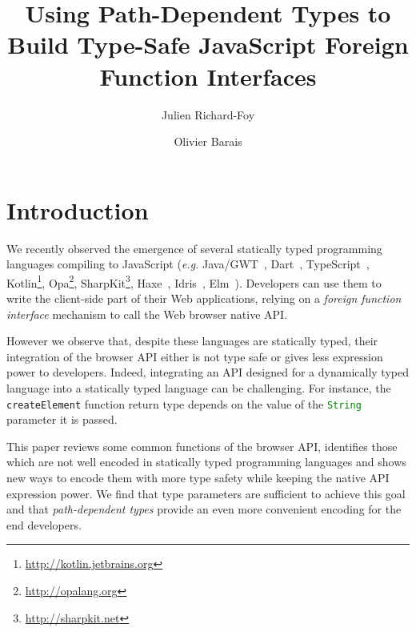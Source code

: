 \documentclass{llncs}
\newcommand{\jscode}[1]{\lstinline[language=JavaScript]|#1|}
\begin{document}
 \title{Using Path-Dependent Types to Build Type-Safe JavaScript Foreign Function Interfaces}

 \author{Julien Richard-Foy \and Olivier Barais}



 \maketitle

\begin{abstract}

\end{abstract}

\section{Introduction}

We recently observed the emergence of several statically typed programming languages compiling to JavaScript (\emph{e.g.} Java/GWT~\cite{Kereki09_GWT}, Dart~\cite{Griffith11_Dart}, TypeScript~\cite{fenton2012typescript}, Kotlin\footnote{\href{http://kotlin.jetbrains.org}{http://kotlin.jetbrains.org}}, Opa\footnote{\href{http://opalang.org}{http://opalang.org}}, SharpKit\footnote{\href{http://sharpkit.net}{http://sharpkit.net}}, Haxe~\cite{Cannasse08_HaXe}, Idris~\cite{Brady13_Idris}, Elm~\cite{czaplicki2012elm}). Developers can use them to write the client-side part of their Web applications, relying on a \emph{foreign function interface} mechanism to call the Web browser native API.

However we observe that, despite these languages are statically typed, their integration of the browser API either is not type safe or gives less expression power to developers. Indeed, integrating an API designed for a dynamically typed language into a statically typed language can be challenging. For instance, the \jscode{createElement} function return type depends on the value of the \jscode{String} parameter it is passed.

This paper reviews some common functions of the browser API, identifies those which are not well encoded in statically typed programming languages and shows new ways to encode them with more type safety while keeping the native API expression power. We find that type parameters are sufficient to achieve this goal and that \emph{path-dependent types} provide an even more convenient encoding for the end developers.
\end{document}

